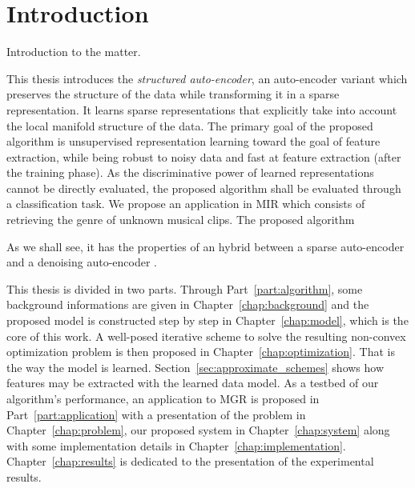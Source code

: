 \documentclass[a4paper,12pt,twoside]{report}
\newcommand{\partref}[1]{Part~\ref{part:#1}}
\newcommand{\chapref}[1]{Chapter~\ref{chap:#1}}
\newcommand{\secref}[1]{Section~\ref{sec:#1}}
\begin{document}
\printglossaries




\chapter*{Introduction}

{\color{red} Introduction to the matter.}


This thesis introduces the \textit{structured auto-encoder}, an auto-encoder variant which preserves the structure of the data while transforming it in a sparse representation. It learns sparse representations that explicitly take into account the local manifold structure of the data.
The primary goal of the proposed algorithm is unsupervised representation learning toward the goal of feature extraction, while being robust to noisy data and fast at feature extraction (after the training phase). As the discriminative power of learned representations cannot be directly evaluated, the proposed algorithm shall be evaluated through a classification task.
We propose an application in \gls{MIR} which consists of retrieving the genre of unknown musical clips. The proposed algorithm 

As we shall see, it has the properties of an hybrid between a sparse auto-encoder \cite{lecun2006sparseAutoencoders, ranzato2007stackedSparseAutoencoders} and a denoising auto-encoder \cite{bengio2008denoisingAutoencoders}.


This thesis is divided in two parts. Through \partref{algorithm},
some background informations are given in \chapref{background} and the proposed model is
constructed step by step in \chapref{model}, which is the core of this work. A well-posed iterative scheme to solve the resulting non-convex optimization problem is then proposed in \chapref{optimization}. That is the way the model is learned. %
\secref{approximate_schemes} shows how features may be extracted with the learned data model.
As a testbed of our algorithm's performance, an application to \gls{MGR} is proposed in \partref{application} with a presentation of the problem in \chapref{problem}, our proposed system in \chapref{system} along with some implementation details in \chapref{implementation}. \chapref{results} is dedicated to the presentation of the experimental results.
\end{document}
